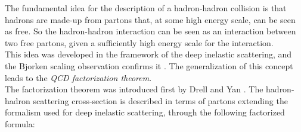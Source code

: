 The fundamental idea for the description of a hadron-hadron collision is that hadrons are made-up from partons that, at some high energy scale, can be seen as free. So the hadron-hadron interaction can be seen as an interaction between two free partons, given a sufficiently high energy scale for the interaction.
\\
This idea was developed in the framework of the deep inelastic scattering, and the Bjorken scaling observation confirms it \cite{Bjorken:1968dy}. The generalization of this concept leads to the \textit{QCD factorization theorem}. 
\\   
The factorization theorem was introduced first by Drell and Yan \cite{DRELL1971578}. 
The hadron-hadron scattering cross-section is described in terms of partons extending the formalism used for deep inelastic scattering, through the following factorized formula:
